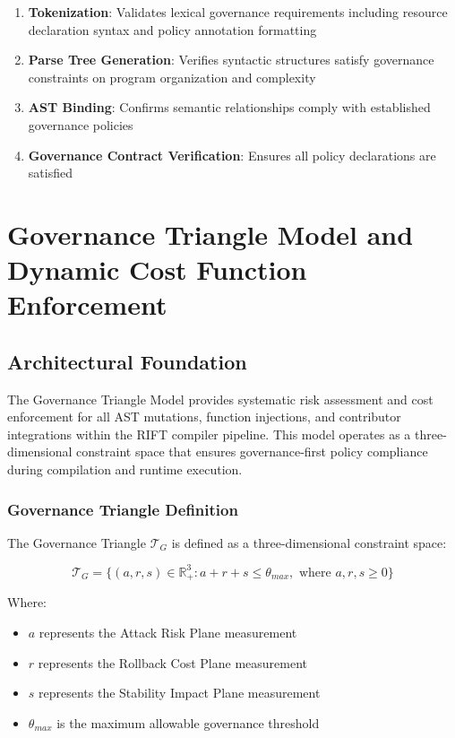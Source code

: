\begin{enumerate}
\item \textbf{Tokenization}: Validates lexical governance requirements including resource declaration syntax and policy annotation formatting
\item \textbf{Parse Tree Generation}: Verifies syntactic structures satisfy governance constraints on program organization and complexity  
\item \textbf{AST Binding}: Confirms semantic relationships comply with established governance policies
\item \textbf{Governance Contract Verification}: Ensures all  policy declarations are satisfied
\end{enumerate}
\section{Governance Triangle Model and Dynamic Cost Function Enforcement}
\label{sec:governance-triangle}

\subsection{Architectural Foundation}

The Governance Triangle Model provides systematic risk assessment and cost enforcement for all AST mutations, function injections, and contributor integrations within the RIFT compiler pipeline. This model operates as a three-dimensional constraint space that ensures governance-first policy compliance during compilation and runtime execution.

\subsubsection{Governance Triangle Definition}

The Governance Triangle $\mathcal{T}_G$ is defined as a three-dimensional constraint space:

\begin{equation}
\mathcal{T}_G = \{(a, r, s) \in \mathbb{R}^3_+ : a + r + s \leq \theta_{max}, \text{ where } a, r, s \geq 0\}
\end{equation}

Where:
\begin{itemize}
    \item $a$ represents the Attack Risk Plane measurement
    \item $r$ represents the Rollback Cost Plane measurement  
    \item $s$ represents the Stability Impact Plane measurement
    \item $\theta_{max}$ is the maximum allowable governance threshold
\end{itemize}

